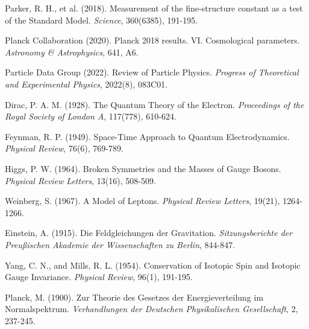 \documentclass[12pt,a4paper]{article}
\numberwithin{equation}{section}
\begin{document}
\begin{thebibliography}{99}
		Parker, R. H., et al. (2018). Measurement of the fine-structure constant as a test of the Standard Model. \emph{Science}, 360(6385), 191-195.
		
		Planck Collaboration (2020). Planck 2018 results. VI. Cosmological parameters. \emph{Astronomy \& Astrophysics}, 641, A6.
		
		Particle Data Group (2022). Review of Particle Physics. \emph{Progress of Theoretical and Experimental Physics}, 2022(8), 083C01.
		
		Dirac, P. A. M. (1928). The Quantum Theory of the Electron. \emph{Proceedings of the Royal Society of London A}, 117(778), 610-624.
		
		Feynman, R. P. (1949). Space-Time Approach to Quantum Electrodynamics. \emph{Physical Review}, 76(6), 769-789.
		
		Higgs, P. W. (1964). Broken Symmetries and the Masses of Gauge Bosons. \emph{Physical Review Letters}, 13(16), 508-509.
		
		Weinberg, S. (1967). A Model of Leptons. \emph{Physical Review Letters}, 19(21), 1264-1266.
		
		Einstein, A. (1915). Die Feldgleichungen der Gravitation. \emph{Sitzungsberichte der Preußischen Akademie der Wissenschaften zu Berlin}, 844-847.
		
		Yang, C. N., and Mills, R. L. (1954). Conservation of Isotopic Spin and Isotopic Gauge Invariance. \emph{Physical Review}, 96(1), 191-195.
		
		Planck, M. (1900). Zur Theorie des Gesetzes der Energieverteilung im Normalspektrum. \emph{Verhandlungen der Deutschen Physikalischen Gesellschaft}, 2, 237-245.
		
	\end{thebibliography}
	
\end{document}
